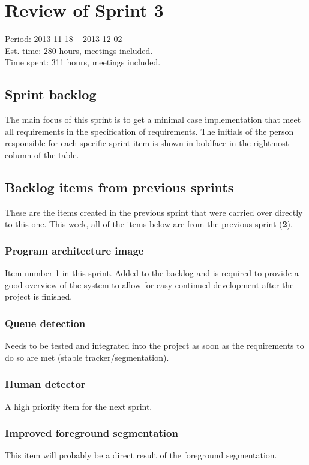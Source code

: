 \section{Review of Sprint 3}
\label{sec:sprint3}
\large Period: 2013-11-18 -- 2013-12-02 \\ 
\large Est. time: 280 hours, meetings included. \\
\large Time spent: 311 hours, meetings included.

\subsection{Sprint backlog}
The main focus of this sprint is to get a minimal case implementation that meet all requirements in the specification of requirements. The initials of the person responsible for each specific sprint item is shown in boldface in the rightmost column of the table.

\subsection{Backlog items from previous sprints}
These are the items created in the previous sprint that were carried over directly to this one. This week, all of the items below are from the previous sprint (\textbf{2}).

\subsubsection{Program architecture image}
Item number 1 in this sprint. Added to the backlog and is required to provide a good overview of the system to allow for easy continued development after the project is finished.

\subsubsection{Queue detection}
Needs to be tested and integrated into the project as soon as the requirements to do so are met (stable tracker/segmentation).

\subsubsection{Human detector}
A high priority item for the next sprint.

\subsubsection{Improved foreground segmentation}
This item will probably be a direct result of the foreground segmentation.

